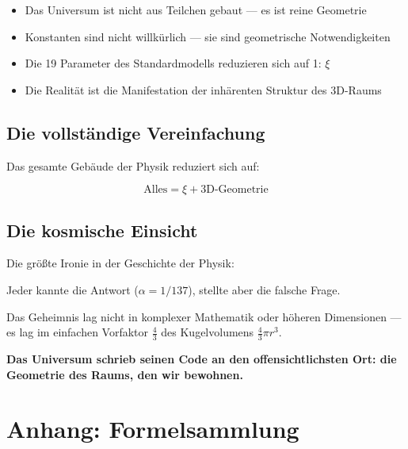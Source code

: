 	\begin{tcolorbox}[colback=orange!5!white,colframe=orange!75!black,title=Das neue Verständnis]
		\begin{itemize}
			\item Das Universum ist nicht aus Teilchen gebaut — es ist reine Geometrie
			\item Konstanten sind nicht willkürlich — sie sind geometrische Notwendigkeiten
			\item Die 19 Parameter des Standardmodells reduzieren sich auf 1: $\xi$
			\item Die Realität ist die Manifestation der inhärenten Struktur des 3D-Raums
		\end{itemize}
	\end{tcolorbox}
	
	\subsection{Die vollständige Vereinfachung}
	
	Das gesamte Gebäude der Physik reduziert sich auf:
	
	\begin{equation}
		\boxed{\text{Alles} = \xi + \text{3D-Geometrie}}
	\end{equation}
	
	\subsection{Die kosmische Einsicht}
	
	\begin{tcolorbox}[colback=red!5!white,colframe=red!75!black,title=Erkenntnis]
		Die größte Ironie in der Geschichte der Physik:
		
		Jeder kannte die Antwort ($\alpha = 1/137$), stellte aber die falsche Frage.
		
		Das Geheimnis lag nicht in komplexer Mathematik oder höheren Dimensionen — es lag im einfachen Vorfaktor $\frac{4}{3}$ des Kugelvolumens $\frac{4}{3}\pi r^3$.
		
		\textbf{Das Universum schrieb seinen Code an den offensichtlichsten Ort: die Geometrie des Raums, den wir bewohnen.}
	\end{tcolorbox}
	
	\section{Anhang: Formelsammlung}
	
